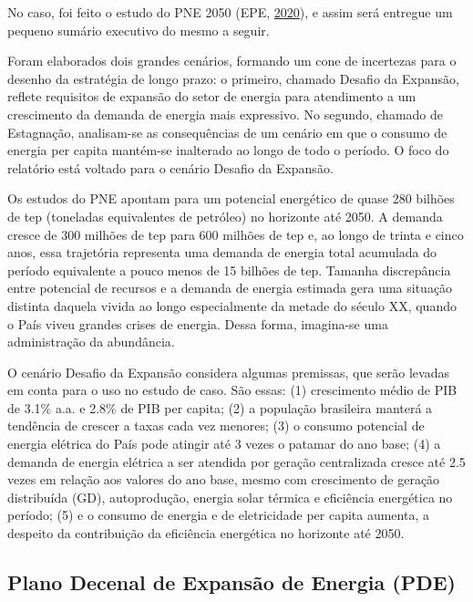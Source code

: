 \documentclass[grad,numbers]{coppe}
\begin{document}
  No caso, foi feito o estudo do PNE 2050 (EPE, \protect\hyperlink{ref-epe2020}{2020}), e assim será entregue um pequeno sumário executivo do mesmo a seguir.
  
  Foram elaborados dois grandes cenários, formando um cone de incertezas para o desenho da estratégia de longo prazo: o primeiro, chamado Desafio da Expansão, reflete requisitos de expansão do setor de energia para atendimento a um crescimento da demanda de energia mais expressivo. No segundo, chamado de Estagnação, analisam-se as consequências de um cenário em que o consumo de energia per capita mantém-se inalterado ao longo de todo o período. O foco do relatório está voltado para o cenário Desafio da Expansão.
  
  Os estudos do PNE apontam para um potencial energético de quase 280 bilhões de tep (toneladas equivalentes de petróleo) no horizonte até 2050. A demanda cresce de 300 milhões de tep para 600 milhões de tep e, ao longo de trinta e cinco anos, essa trajetória representa uma demanda de energia total acumulada do período equivalente a pouco menos de 15 bilhões de tep. Tamanha discrepância entre potencial de recursos e a demanda de energia estimada gera uma situação distinta daquela vivida ao longo especialmente da metade do século XX, quando o País viveu grandes crises de energia. Dessa forma, imagina-se uma administração da abundância.
  
  O cenário Desafio da Expansão considera algumas premissas, que serão levadas em conta para o uso no estudo de caso. São essas: (1) crescimento médio de PIB de 3.1\% a.a. e 2.8\% de PIB per capita; (2) a população brasileira manterá a tendência de crescer a taxas cada vez menores; (3) o consumo potencial de energia elétrica do País pode atingir até 3 vezes o patamar do ano base; (4) a demanda de energia elétrica a ser atendida por geração centralizada cresce até 2.5 vezes em relação aos valores do ano base, mesmo com crescimento de geração distribuída (GD), autoprodução, energia solar térmica e eficiência energética no período; (5) e o consumo de energia e de eletricidade per capita aumenta, a despeito da contribuição da eficiência energética no horizonte até 2050.
  
  \hypertarget{plano-decenal-de-expansuxe3o-de-energia-pde}{%
  \subsection{Plano Decenal de Expansão de Energia (PDE)}\label{plano-decenal-de-expansuxe3o-de-energia-pde}}
  
\end{document}
